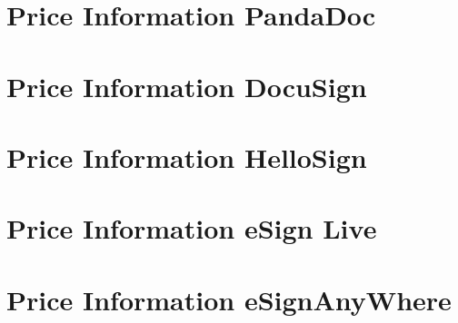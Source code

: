 \section{Price Information PandaDoc} \label{sec:pandaPrice}


\section{Price Information DocuSign} \label{sec:docusignPrice}


\section{Price Information HelloSign} \label{sec:hellosignPrice}


\section{Price Information eSign Live} \label{sec:esignlivePrice}


\section{Price Information eSignAnyWhere} \label{sec:esignanyPrice}
